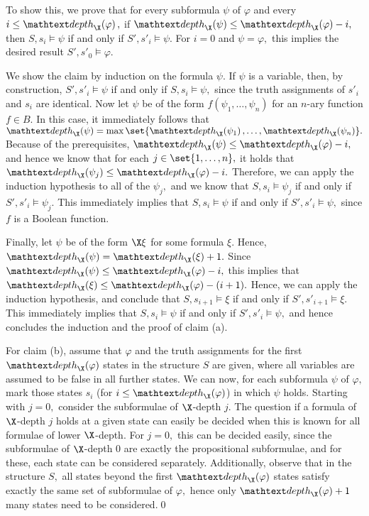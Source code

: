     To show this, we prove that for every subformula $\psi$ of $\varphi$ and every $i\leq\xdepth\varphi,$ if $\xdepth\psi\leq\xdepth\varphi-i,$ then $S,s_i\models\psi$ if and only if $S',s'_i\models\psi.$ For $i=0$ and $\psi=\varphi,$ this implies the desired result $S',s'_0\models\varphi.$

    We show the claim by induction on the formula $\psi.$ If $\psi$ is a variable, then, by construction, $S',s'_i\models\psi$ if and only if $S,s_i\models\psi,$ since the truth assignments of $s'_i$ and $s_i$ are identical. Now let $\psi$ be of the form $f(\psi_1,\dots,\psi_n)$ for an $n$-ary function $f\in B.$ In this case, it immediately follows that $\xdepth\psi=\max\set{\xdepth{\psi_1},\dots,\xdepth{\psi_n}}.$  Because of the prerequisites, $\xdepth\psi\leq\xdepth\varphi-i,$ and hence we know that for each $j\in\set{1,\dots,n},$ it holds that $\xdepth{\psi_j}\leq\xdepth\varphi-i.$ Therefore, we can apply the induction hypothesis to all of the $\psi_j,$ and we know that $S,s_i\models\psi_j$ if and only if $S',s'_i\models\psi_j.$ This immediately implies that $S,s_i\models\psi$ if and only if $S',s'_i\models\psi,$ since $f$ is a Boolean function.

    Finally, let $\psi$ be of the form $\X\xi$ for some formula $\xi.$ Hence, $\xdepth\psi=\xdepth\xi+1.$ Since $\xdepth\psi\leq\xdepth\varphi-i,$ this implies that $\xdepth\xi\leq\xdepth\varphi-(i+1).$ Hence, we can apply the induction hypothesis, and conclude that $S,s_{i+1}\models\xi$ if and only if $S',s'_{i+1}\models\xi.$ This immediately implies that $S,s_i\models\psi$ if and only if $S',s'_i\models\psi,$ and hence concludes the induction and the proof of claim (a).

    For claim (b), assume that $\varphi$ and the truth assignments for the first $\xdepth\varphi$ states in the structure $S$ are given, where all variables are assumed to be false in all further states. We can now, for each subformula $\psi$ of $\varphi,$ mark those states $s_i$ (for $i\leq\xdepth\varphi$) in which $\psi$ holds. Starting with $j=0,$ consider the subformulae of $\X$-depth $j.$ The question if a formula of $\X$-depth $j$ holds at a given state can easily be decided when this is known for all formulae of lower $\X$-depth. For $j=0,$ this can be decided easily, since the subformulae of $\X$-depth $0$ are exactly the propositional subformulae, and for these, each state can be considered separately. Additionally, observe that in the structure $S,$ all states beyond the first $\xdepth\varphi$ states satisfy exactly the same set of subformulae of $\varphi,$ hence only $\xdepth\varphi+1$ many states need to be considered.\qed
    \fi


